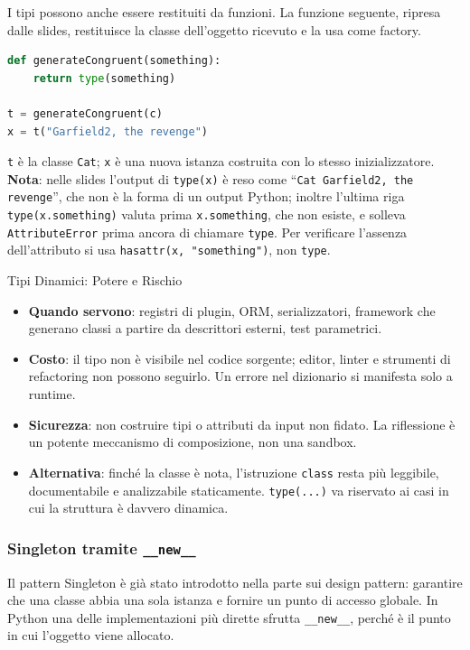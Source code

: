 \documentclass[12pt]{extarticle}
\begin{document}
\noindent I tipi possono anche essere restituiti da funzioni. La funzione seguente, ripresa dalle slides, restituisce la classe dell'oggetto ricevuto e la usa come factory.

\begin{lstlisting}[language=Python]
def generateCongruent(something):
    return type(something)

t = generateCongruent(c)
x = t("Garfield2, the revenge")
\end{lstlisting}

\noindent \texttt{t} è la classe \texttt{Cat}; \texttt{x} è una nuova istanza costruita con lo stesso inizializzatore. \textbf{Nota}: nelle slides l'output di \texttt{type(x)} è reso come ``\texttt{Cat Garfield2, the revenge}'', che non è la forma di un output Python; inoltre l'ultima riga \texttt{type(x.something)} valuta prima \texttt{x.something}, che non esiste, e solleva \texttt{AttributeError} prima ancora di chiamare \texttt{type}. Per verificare l'assenza dell'attributo si usa \texttt{hasattr(x, "something")}, non \texttt{type}.

\begin{cbox}{Tipi Dinamici: Potere e Rischio}
\begin{itemize}
    \item \textbf{Quando servono}: registri di plugin, ORM, serializzatori, framework che generano classi a partire da descrittori esterni, test parametrici.
    \item \textbf{Costo}: il tipo non è visibile nel codice sorgente; editor, linter e strumenti di refactoring non possono seguirlo. Un errore nel dizionario si manifesta solo a runtime.
    \item \textbf{Sicurezza}: non costruire tipi o attributi da input non fidato. La riflessione è un potente meccanismo di composizione, non una sandbox.
    \item \textbf{Alternativa}: finché la classe è nota, l'istruzione \texttt{class} resta più leggibile, documentabile e analizzabile staticamente. \texttt{type(...)} va riservato ai casi in cui la struttura è davvero dinamica.
\end{itemize}
\end{cbox}

\subsubsection{Singleton tramite \texttt{\_\_new\_\_}}

\noindent Il pattern Singleton è già stato introdotto nella parte sui design pattern: garantire che una classe abbia una sola istanza e fornire un punto di accesso globale. In Python una delle implementazioni più dirette sfrutta \texttt{\_\_new\_\_}, perché è il punto in cui l'oggetto viene allocato.
\end{document}
